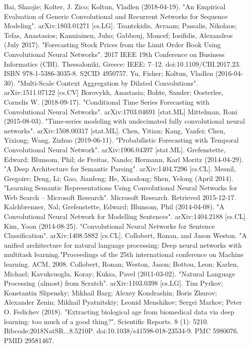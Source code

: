 \documentclass[11pt]{report}
\begin{document}
\begin{thebibliography}{100}
	 Bai, Shaojie; Kolter, J. Zico; Koltun, Vladlen (2018-04-19). "An Empirical Evaluation of Generic Convolutional and Recurrent Networks for Sequence Modeling". arXiv:1803.01271 [cs.LG].
	 Tsantekidis, Avraam; Passalis, Nikolaos; Tefas, Anastasios; Kanniainen, Juho; Gabbouj, Moncef; Iosifidis, Alexandros (July 2017). "Forecasting Stock Prices from the Limit Order Book Using Convolutional Neural Networks". 2017 IEEE 19th Conference on Business Informatics (CBI). Thessaloniki, Greece: IEEE: 7–12. doi:10.1109/CBI.2017.23. ISBN 978-1-5386-3035-8. S2CID 4950757.
	 Yu, Fisher; Koltun, Vladlen (2016-04-30). "Multi-Scale Context Aggregation by Dilated Convolutions". arXiv:1511.07122 [cs.CV]
	 Borovykh, Anastasia; Bohte, Sander; Oosterlee, Cornelis W. (2018-09-17). "Conditional Time Series Forecasting with Convolutional Neural Networks". arXiv:1703.04691 [stat.ML]
	 Mittelman, Roni (2015-08-03). "Time-series modeling with undecimated fully convolutional neural networks". arXiv:1508.00317 [stat.ML].
	 Chen, Yitian; Kang, Yanfei; Chen, Yixiong; Wang, Zizhuo (2019-06-11). "Probabilistic Forecasting with Temporal Convolutional Neural Network". arXiv:1906.04397 [stat.ML].
	 Grefenstette, Edward; Blunsom, Phil; de Freitas, Nando; Hermann, Karl Moritz (2014-04-29). "A Deep Architecture for Semantic Parsing". arXiv:1404.7296 [cs.CL].
	 Mesnil, Gregoire; Deng, Li; Gao, Jianfeng; He, Xiaodong; Shen, Yelong (April 2014). "Learning Semantic Representations Using Convolutional Neural Networks for Web Search – Microsoft Research". Microsoft Research. Retrieved 2015-12-17.
	 Kalchbrenner, Nal; Grefenstette, Edward; Blunsom, Phil (2014-04-08). "A Convolutional Neural Network for Modelling Sentences". arXiv:1404.2188 [cs.CL].
	 Kim, Yoon (2014-08-25). "Convolutional Neural Networks for Sentence Classification". arXiv:1408.5882 [cs.CL].
	 Collobert, Ronan, and Jason Weston. "A unified architecture for natural language processing: Deep neural networks with multitask learning."Proceedings of the 25th international conference on Machine learning. ACM, 2008.
	 Collobert, Ronan; Weston, Jason; Bottou, Leon; Karlen, Michael; Kavukcuoglu, Koray; Kuksa, Pavel (2011-03-02). "Natural Language Processing (almost) from Scratch". arXiv:1103.0398 [cs.LG].
	 Tim Pyrkov; Konstantin Slipensky; Mikhail Barg; Alexey Kondrashin; Boris Zhurov; Alexander Zenin; Mikhail Pyatnitskiy; Leonid Menshikov; Sergei Markov; Peter O. Fedichev (2018). "Extracting biological age from biomedical data via deep learning: too much of a good thing?". Scientific Reports. 8 (1): 5210. Bibcode:2018NatSR...8.5210P. doi:10.1038/s41598-018-23534-9. PMC 5980076. PMID 29581467.
	
\end{thebibliography}
\end{document}
